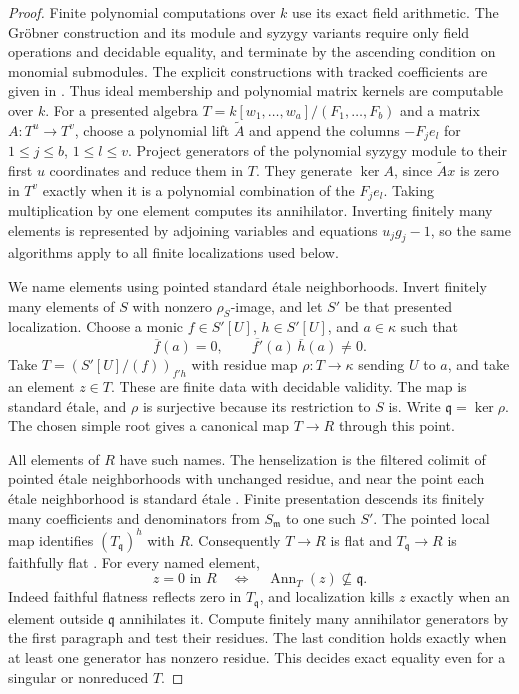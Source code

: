 \begin{proof}
Finite polynomial computations over $k$ use its
exact field arithmetic.  The Gr\"obner construction
and its module and syzygy variants require only
field operations and decidable equality, and
terminate by the ascending condition on monomial
submodules.  The explicit constructions with
tracked coefficients are given in
\cite[Sections 4.3--4.4 and 5.1--5.3,
pp.\ 240--249]{C-BuchbergerSystems2001}.
Thus ideal membership and polynomial matrix
kernels are computable over $k$.
For a presented algebra
$T=k[w_1,\ldots,w_a]/(F_1,\ldots,F_b)$
and a matrix $A:T^u\to T^v$, choose a polynomial
lift $\widetilde A$ and append the columns
$-F_j e_l$ for $1\leq j\leq b$, $1\leq l\leq v$.
Project generators of the polynomial syzygy
module to their first $u$ coordinates and reduce
them in $T$.  They generate $\ker A$, since
$\widetilde A x$ is zero in $T^v$ exactly when
it is a polynomial combination of the $F_j e_l$.
Taking multiplication by one element computes
its annihilator.  Inverting finitely many elements
is represented by adjoining variables and equations
$u_jg_j-1$, so the same algorithms apply to all
finite localizations used below.

We name elements using pointed standard \'etale
neighborhoods.  Invert finitely many elements of
$S$ with nonzero $\rho_S$-image, and let $S'$ be
that presented localization.  Choose a monic
$f\in S'[U]$, $h\in S'[U]$, and $a\in\kappa$
such that
\[
 \overline f(a)=0,\qquad
 \overline{f'}(a)\,\overline h(a)\ne0.
                                                               \tag{C.3.CH1}
\]
Take
$T=(S'[U]/(f))_{f'h}$ with residue map
$\rho:T\to\kappa$ sending $U$ to $a$,
and take an element $z\in T$.
These are finite data with decidable validity.
The map is standard \'etale, and $\rho$ is
surjective because its restriction to $S$ is.
Write $\mathfrak q=\ker\rho$.
The chosen simple root gives a canonical map
$T\to R$ through this point.

All elements of $R$ have such names.  The
henselization is the filtered colimit of pointed
\'etale neighborhoods with unchanged residue,
and near the point each \'etale neighborhood is
standard \'etale
\cite[Lemma 10.155.1 and Proposition 10.144.4,
Tags 0BSK and 00UE]{C-StacksHenselianEffective}.
Finite presentation descends its finitely many
coefficients and denominators from $S_{\mathfrak m}$
to one such $S'$.
The pointed local map identifies
$(T_{\mathfrak q})^h$ with $R$.
Consequently $T\to R$ is flat and
$T_{\mathfrak q}\to R$ is faithfully flat
\cite[Section 10.155 and Lemma 15.46.1,
Tags 0BSK and 07QL]{C-StacksHenselianEffective}.
For every named element,
\[
 z=0\text{ in }R
 \quad\Longleftrightarrow\quad
 \operatorname{Ann}_T(z)\not\subseteq\mathfrak q.
                                                               \tag{C.3.CH2}
\]
Indeed faithful flatness reflects zero in
$T_{\mathfrak q}$, and localization kills $z$
exactly when an element outside $\mathfrak q$
annihilates it.  Compute finitely many annihilator
generators by the first paragraph and test their
residues.  The last condition holds exactly
when at least one generator has nonzero residue.
This decides exact equality even for a singular
or nonreduced $T$.


\end{proof}

